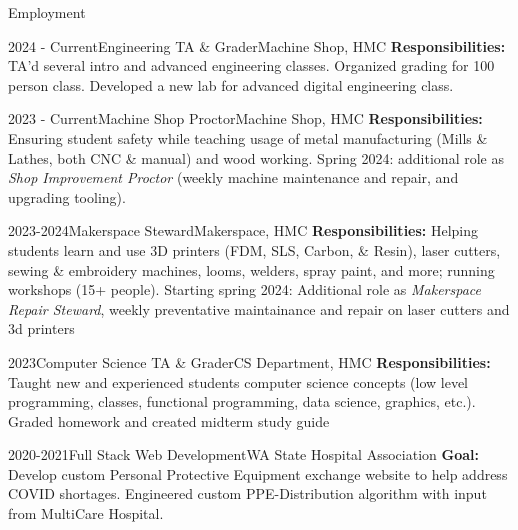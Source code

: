 \documentclass[]{mcdowellcv}
\begin{document}
\begin{cvsection}{Employment}
	\begin{cvsubsection}{2024 - Current}{Engineering TA \& Grader}{Machine Shop, HMC}
		\vspace{0.2em}
		\textbf{Responsibilities:} TA'd several intro and advanced engineering classes. Organized grading for 100 person class. Developed a new lab for advanced digital engineering class.
	\end{cvsubsection}

	\begin{cvsubsection}{2023 - Current}{Machine Shop Proctor}{Machine Shop, HMC}
		\vspace{0.2em}
		\textbf{Responsibilities:} Ensuring student safety while teaching usage of metal manufacturing (Mills \& Lathes, both CNC \& manual) and wood working.
		Spring 2024: additional role as \textit{Shop Improvement Proctor} (weekly machine maintenance and repair, and upgrading tooling).
	\end{cvsubsection}

	\begin{cvsubsection}{2023-2024}{Makerspace Steward}{Makerspace, HMC}
		\vspace{0.2em}
		\textbf{Responsibilities:} Helping students learn and use 3D printers (FDM, SLS, Carbon, \& Resin), laser cutters, sewing \& embroidery machines, looms, welders, spray paint, and more; running workshops (15+ people). Starting spring 2024: Additional role as \textit{Makerspace Repair Steward}, weekly preventative maintainance and repair on laser cutters and 3d printers
	\end{cvsubsection}

	\begin{cvsubsection}{2023}{Computer Science TA \& Grader}{CS Department, HMC}
		\vspace{0.2em}
		\textbf{Responsibilities:} Taught new and experienced students computer science concepts (low level programming, classes, functional programming, data science, graphics, etc.). Graded homework and created midterm study guide
	\end{cvsubsection}

	\begin{cvsubsection}{2020-2021}{Full Stack Web Development}{WA State Hospital Association}
		\textbf{Goal:} Develop custom Personal Protective Equipment exchange website to help address COVID shortages. Engineered custom PPE-Distribution algorithm with input from  MultiCare Hospital.
	\end{cvsubsection}
\end{cvsection}
\end{document}
